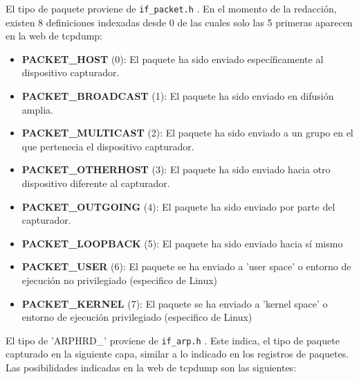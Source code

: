 El tipo de paquete proviene de \texttt{if\_packet.h} \cite{linuxifpacket}. En el momento de la redacción, existen 8 definiciones indexadas desde 0 de las cuales solo las 5 primeras aparecen en la web de tcpdump:

\begin{itemize}
    \item \textbf{PACKET\_HOST} (0): El paquete ha sido enviado específicamente al dispositivo capturador.
    \item \textbf{PACKET\_BROADCAST} (1): El paquete ha sido enviado en difusión amplia.
    \item \textbf{PACKET\_MULTICAST} (2): El paquete ha sido enviado a un grupo en el que pertenecia el dispositivo capturador.
    \item \textbf{PACKET\_OTHERHOST} (3): El paquete ha sido enviado hacia otro dispositivo diferente al capturador.
    \item \textbf{PACKET\_OUTGOING} (4): El paquete ha sido enviado por parte del capturador.
    \item \textbf{PACKET\_LOOPBACK} (5): El paquete ha sido enviado hacia sí mismo
    \item \textbf{PACKET\_USER} (6): El paquete se ha enviado a 'user space' o entorno de ejecución no privilegiado (especifico de Linux)
    \item \textbf{PACKET\_KERNEL} (7):  El paquete se ha enviado a 'kernel space' o entorno de ejecución privilegiado (especifico de Linux)
\end{itemize}

El tipo de 'ARPHRD\_' proviene de \texttt{if\_arp.h} \cite{linuxifarp}. Este indica, el tipo de paquete capturado en la siguiente capa, similar a lo indicado en los registros de paquetes. Las posibilidades indicadas en la web de tcpdump son las siguientes:

